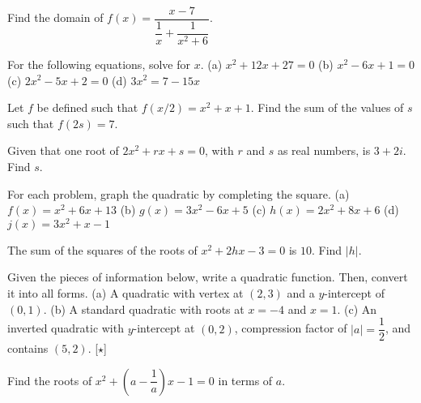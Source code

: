 \documentclass[lang=en,11pt]{elegantbook}
\begin{document}
\begin{reviewset}
\item Find the domain of $f(x)=\dfrac{x-7}{\dfrac{1}{x}+\dfrac{1}{x^2+6}}.$ \vspace{2mm}
\item For the following equations, solve for $x$.  \newline
(a) $x^2+12x+27=0$ \hspace{48mm} (b) $x^2-6x+1=0$ \newline 
(c) $2x^2-5x+2=0$ \hspace{50mm} (d) $3x^2=7-15x$ \vspace{2mm}
\item Let $f$ be defined such that $f(x/2)=x^2+x+1$.  Find the sum of the values of $s$ such that $f(2s)=7$.  \vspace{2mm}
\item Given that one root of $2x^2+rx+s=0$, with $r$ and $s$ as real numbers, is $3+2i$.  Find $s$.  \vspace{2mm}
\item For each problem, graph the quadratic by completing the square.  \newline 
(a) $f(x)=x^2+6x+13$ \hspace{49mm}
(b) $g(x)=3x^2-6x+5$ \newline
(c) $h(x)=2x^2+8x+6$ \hspace{49mm}
(d) $j(x)=3x^2+x-1$ \vspace{2mm}
\item The sum of the squares of the roots of $x^2+2hx-3=0$ is $10$.  Find $|h|$.  \vspace{2mm}
\item Given the pieces of information below, write a quadratic function.  Then, convert it into all forms.  \newline 
(a) A quadratic with vertex at $(2,3)$ and a $y$-intercept of $(0,1)$.  \newline 
(b) A standard quadratic with roots at $x=-4$ and $x=1$.  \newline
(c) An inverted quadratic with $y$-intercept at $(0,2)$, compression factor of $|a|=\dfrac{1}{2}$, and contains $(5,2)$.  [$\star$] \vspace{2mm}
\item Find the roots of $x^2+\left(a-\dfrac{1}{a}\right)x-1=0$ in terms of $a$.  \vspace{2mm}
\end{reviewset}
\end{document}

